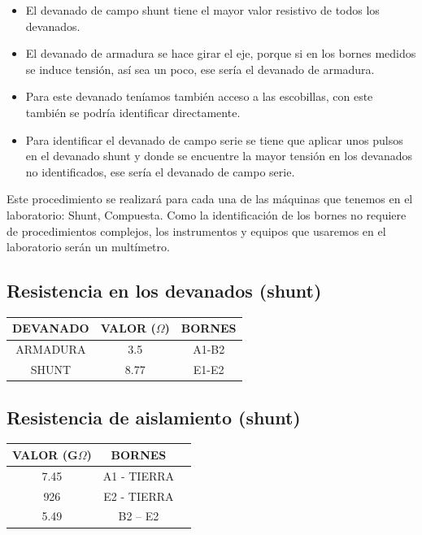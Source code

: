 \begin{itemize}
    \item El devanado de campo shunt tiene el mayor valor resistivo de todos los devanados.
    
    \item El devanado de armadura se hace girar el eje, porque si en los bornes medidos se induce tensión, así sea un poco, ese sería el devanado de armadura.
    
    \item Para este devanado teníamos también acceso a las escobillas, con este también se podría identificar directamente.
    
    \item Para identificar el devanado de campo serie se tiene que aplicar unos pulsos en el devanado shunt y donde se encuentre la mayor tensión en los devanados no identificados, ese sería el devanado de campo serie.
\end{itemize}

Este procedimiento se realizará para cada una de las máquinas que tenemos en el laboratorio: Shunt, Compuesta. Como la identificación de los bornes no requiere de procedimientos complejos, los instrumentos y equipos que usaremos en el laboratorio serán un multímetro.

\subsection*{Resistencia en los devanados (shunt)}

\begin{tabular}{|c|c|c|}
\hline
DEVANADO & VALOR ($\Omega$) & BORNES \\
\hline
ARMADURA & 3.5 & A1-B2 \\
SHUNT & 8.77 & E1-E2 \\
\hline
\end{tabular}

\subsection*{Resistencia de aislamiento (shunt)}

\begin{tabular}{|c|c|c|}
\hline
VALOR (G$\Omega$) & BORNES \\
\hline
7.45 & A1 - TIERRA \\
926 & E2 - TIERRA \\
5.49 & B2 – E2 \\
\hline
\end{tabular}

